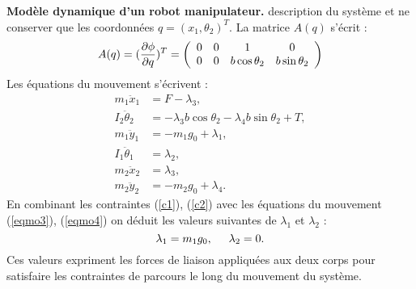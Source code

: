 \begin{exemple} {\bf Modèle dynamique d'un robot manipulateur.}
description du système et ne conserver que les coordonnées $q=(x_1, \theta_2)^{T}$.
La matrice $A(q)$ s'écrit :
$$  
A(q) = (\frac{\partial \phi}{\partial q})^{T} = \bma{cccc} 0 & 0 & 1 & 0 \\ 
0 & 0 & b\cos\theta_2 & b\sin\theta_2 \ema
$$  
Les équations du mouvement s'écrivent :
\begin{align}
m_1\ddot x_1 &= F - \lambda_3, \label{eqmo1}\\
I_2\ddot \theta_2 &= - \lambda_3b\cos\theta_2 - \lambda_4b\sin\theta_2 
+ T, \label{eqmo2} \\ 
m_1\ddot y_1 &= - m_1g_0 + \lambda_1, \label{eqmo3}\\
I_1\ddot \theta_1 &= \lambda_2, \label{eqmo4}\\
m_2\ddot x_2 &= \lambda_3, \label{eqmo5}\\
m_2\ddot y_2 &= -m_2g_0 + \lambda_4. \label{eqmo6}
\end{align}
En combinant les contraintes (\ref{c1}), (\ref{c2}) avec les équations du mouvement
(\ref{eqmo3}), (\ref{eqmo4}) on déduit les valeurs suivantes de $\lambda_1$ et $\lambda_2$ :
$$
\lambda_1 = m_1g_0,\hd \lambda_2 =0.
$$
Ces valeurs expriment les forces de liaison appliquées aux deux corps pour satisfaire
les contraintes de parcours le long du mouvement du système.


\end{exemple}
